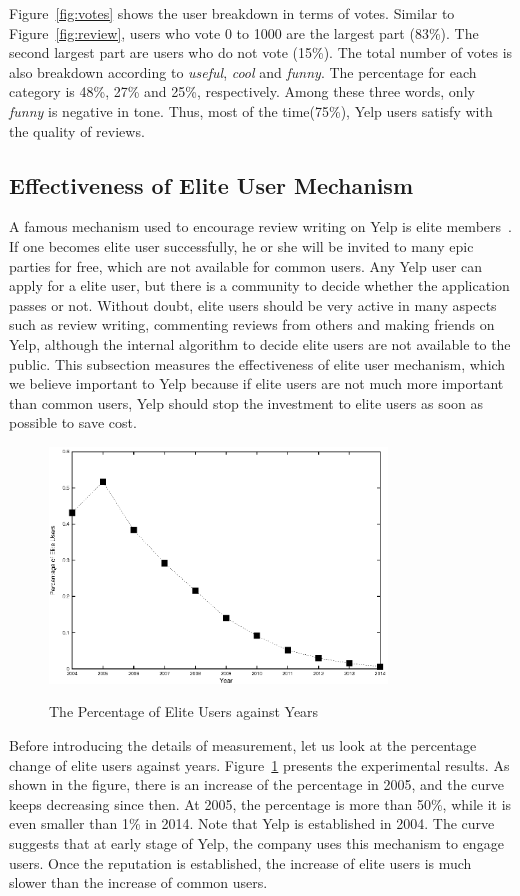 \documentclass[11pt, oneside]{article}   	%
\begin{document}
Figure~\ref{fig:votes} shows the user breakdown in terms of votes.  Similar to Figure~\ref{fig:review}, users who 
vote 0 to 1000 are the largest part (83\%). The second largest part are users who do not vote (15\%). The 
total number of votes is also breakdown according to \textit{useful}, \textit{cool} and \textit{funny}. The percentage 
for each category is 48\%, 27\% and 25\%, respectively.  Among these three words, only \textit{funny} is 
negative in tone. Thus, most of the time(75\%), Yelp users satisfy with the quality of reviews. 

\subsection{Effectiveness of Elite User Mechanism}
A famous mechanism used to encourage review writing on Yelp is elite members~\cite{elite}. If one becomes
elite user successfully, he or she will be invited to many epic parties for free, which are not available for common 
users. Any Yelp user can apply for a elite user, but there is a  community to decide whether the application passes 
or not. Without doubt, elite users should be very active in many aspects such as review writing, commenting 
reviews from others and making friends on Yelp, although the internal algorithm to decide elite users are not
available to the public.  This subsection measures the effectiveness of elite user mechanism, which we believe 
important to Yelp because if elite users are not much more important than common users, Yelp should stop the 
investment to elite users as soon as possible to save cost.  

\begin{figure}[t]
  \centering
  \caption{The Percentage of Elite Users against Years} 
       \includegraphics[width=0.8\textwidth]{figures/elite.eps}
  \label{fig:elite}
\end{figure} 
Before introducing the details of measurement, let us look at the percentage change of elite users against years.
Figure~\ref{fig:elite} presents the experimental results. As shown in the figure, there is an increase of the percentage 
in 2005, and the curve keeps decreasing since then. At 2005, the percentage is more than 50\%, while it is 
even smaller than 1\% in 2014. Note that Yelp is established in 2004. The curve suggests that at early stage of 
Yelp, the company uses this mechanism to engage users. Once the reputation is established, the increase of 
elite users is much slower than the increase of common users. 
\end{document}
